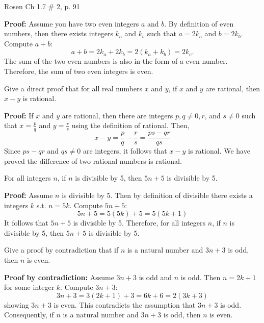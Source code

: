 \documentclass[12pt,addpoints]{exam}
\begin{document}
\begin{questions}
\question Rosen Ch 1.7 \# 2, p. 91
    \ifprintanswers
        \vspace{-10pt}
    \fi
\begin{solution} \textbf{Proof:} Assume you have two even integers $a$ and $b$.  By definition of even numbers, then there exists integers $k_a$ and $k_b$ such that $a=2k_a$ and $b=2k_b$.  Compute $a+b$:
    $$a+b = 2k_a + 2k_b = 2(k_a + k_b) = 2k_c.$$
    The sum of the two even numbers is also in the form of a even number.
    Therefore, the sum of two even integers is even.
\end{solution}


\question Give a direct proof that for all real numbers $x$ and $y$,
if $x$ and $y$ are rational, then $x-y$ is rational.
    \ifprintanswers
        \vspace{-10pt}
    \fi
\begin{solution} \textbf{Proof:} If $x$ and $y$ are rational, then there are
    integers $p, q\neq 0, r$, and $s\neq 0$ such that
    $x = \frac{p}{q}$ and $y = \frac{r}{s}$ using the definition of rational.  Then,
    \[ x - y = \frac{p}{q} - \frac{r}{s} = \frac{ps - qr}{qs} \]
    Since $ps - qr$ and $qs \neq 0$ are integers, it follows
    that $x - y$ is rational.  We have proved the difference of
    two rational numbers is rational.
\end{solution}


\question For all integers $n$, if $n$ is divisible by 5,
then $5n+5$ is divisible by 5.
    \ifprintanswers
        \vspace{-10pt}
    \fi
\begin{solution} \textbf{Proof:} Assume $n$ is divisible by 5.
    Then by definition of divisible there exists a integers
    $k$ s.t. $n=5k$. Compute $5n+5$:
    \[ 5n + 5 = 5(5k) + 5 = 5(5k + 1) \]
    It follows that $5n+5$ is divisible by 5. Therefore, for all
    integers $n$, if $n$ is divisible by 5, then $5n+5$ is
    divisible by 5.
\end{solution}


\question Give a proof by contradiction that if $n$ is a natural
number and $3n+3$ is odd, then $n$ is even.
    \ifprintanswers
        \vspace{-10pt}
    \fi
\begin{solution}
    \textbf{Proof by contradiction:} Assume $3n+3$ is odd and $n$ is
    odd.  Then $n=2k + 1$ for some integer $k$.  Compute
    $3n+3$:
    \[ 3n + 3 = 3(2k+1) + 3 = 6k + 6 = 2(3k + 3)\]
    showing $3n+3$ is even. This contradicts the assumption that $3n
    + 3$ is odd. Consequently, if $n$ is a natural number and $3n + 3$ is odd, then $n$ is even.
\end{solution}



\end{questions}
\end{document}
